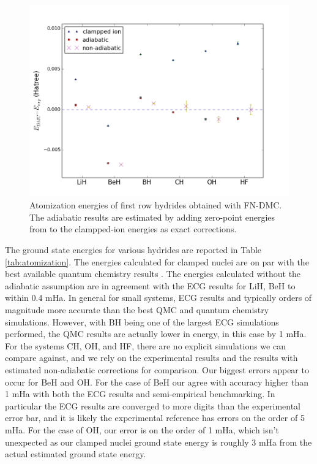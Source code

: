 \documentclass[pra,superscriptaddress,groupedaddress,twocolumn]{revtex4}
\begin{document}
\begin{figure}
\includegraphics[scale=.4]{Figures/atomization}
\caption{Atomization energies of first row hydrides obtained with FN-DMC. The adiabatic results are estimated by adding zero-point energies from \cite{Feller_Corrections} to the clampped-ion energies as exact corrections.}
\end{figure}

The ground state energies for various hydrides are reported in Table \ref{tab:atomization}. The energies calculated for clamped nuclei are on par with the best available quantum chemistry results \cite{Adamowicz_LiH,Koput_BeH,Miliordos_BH}. The energies calculated without the adiabatic assumption are in agreement with the ECG results for LiH, BeH to within 0.4 mHa.   In general for small systems, ECG results and typically orders of magnitude more accurate than the best QMC and quantum chemistry simulations.  However, with BH being one of the largest ECG simulations performed, the QMC results are actually lower in energy, in this case by 1 mHa.  For the systems CH, OH, and HF, there are no explicit simulations we can compare against, and we rely on the experimental results and the results with estimated non-adiabatic corrections for comparison.  Our biggest errors appear to occur for BeH and OH.   For the case of BeH our agree with accuracy higher than 1 mHa with both the ECG results and semi-empirical benchmarking.  In particular the ECG results are converged to more digits than the experimental error bar, and it is likely the experimental reference has errors on the order of 5 mHa.   For the case of OH, our error is on the order of 1 mHa, which isn't unexpected as our clamped nuclei ground state energy is roughly 3 mHa from the actual estimated ground state energy.
 
\end{document}
